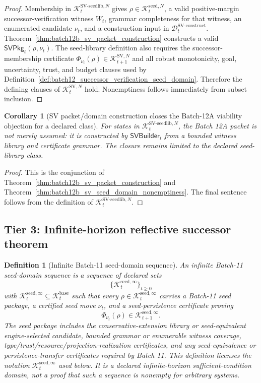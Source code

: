 \documentclass[11pt]{article}
\newtheorem{corollary}[theorem]{Corollary}
\newtheorem{definition}[theorem]{Definition}
\newcommand{\1}{\mathbf{1}}
\providecommand{\Dcal}{\mathcal{D}}
\providecommand{\Kcal}{\mathcal{K}}
\begin{document}
\begin{proof}
Membership in \(\Kcal_t^{\mathrm{SV\mbox{-}seedlib},N}\) gives \(\rho\in\Kcal_t^{\mathrm{seed},N}\), a valid positive-margin successor-verification witness \(W_t\), grammar completeness for that witness, an enumerated candidate \(\nu_t\), and a construction input in \(\Dcal_t^{\mathrm{SV\mbox{-}construct}}\).  Theorem~\ref{thm:batch12b_sv_packet_construction} constructs a valid \(\mathsf{SVPkg}_t(\rho,\nu_t)\).  The seed-library definition also requires the successor-membership certificate \(\Phi_{\nu_t}(\rho)\in\Kcal_{t+1}^{\mathrm{SV},N}\) and all robust monotonicity, goal, uncertainty, trust, and budget clauses used by Definition~\ref{def:batch12_successor_verification_seed_domain}.  Therefore the defining clauses of \(\Kcal_t^{\mathrm{SV},N}\) hold.  Nonemptiness follows immediately from subset inclusion.
\end{proof}

\begin{corollary}[SV packet/domain construction closes the Batch-12A viability objection for a declared class]
\label{cor:batch12b_closes_viability_objection_declared_class}
For states in \(\Kcal_t^{\mathrm{SV\mbox{-}seedlib},N}\), the Batch 12A packet is not merely assumed: it is constructed by \(\mathsf{SVBuilder}_t\) from a bounded witness library and certificate grammar.  The closure remains limited to the declared seed-library class.
\end{corollary}

\begin{proof}
This is the conjunction of Theorem~\ref{thm:batch12b_sv_packet_construction} and Theorem~\ref{thm:batch12b_sv_seed_domain_nonemptiness}.  The final sentence follows from the definition of \(\Kcal_t^{\mathrm{SV\mbox{-}seedlib},N}\).
\end{proof}

\subsection{Tier 3: Infinite-horizon reflective successor theorem}

\begin{definition}[Infinite Batch-11 seed-domain sequence]
\label{def:batch12b_infinite_batch11_seed_domain_sequence}
An infinite Batch-11 seed-domain sequence is a sequence of declared sets
\[
\{\Kcal_t^{\mathrm{seed},\infty}\}_{t\ge0}
\]
with \(\Kcal_t^{\mathrm{seed},\infty}\subseteq\Kcal_t^{\mathrm{base}}\) such that every
\(\rho\in\Kcal_t^{\mathrm{seed},\infty}\) carries a Batch-11 seed package, a certified seed move \(\nu_t\), and a seed-persistence certificate proving
\[
\Phi_{\nu_t}(\rho)\in\Kcal_{t+1}^{\mathrm{seed},\infty}.
\]
The seed package includes the conservative-extension library or seed-equivalent engine-selected candidate, bounded grammar or enumerable witness coverage, type/trust/resource/projection-realization certificates, and any seed-equivalence or persistence-transfer certificates required by Batch 11.  This definition licenses the notation \(\Kcal_t^{\mathrm{seed},\infty}\) used below.  It is a declared infinite-horizon sufficient-condition domain, not a proof that such a sequence is nonempty for arbitrary systems.
\end{definition}
\end{document}
